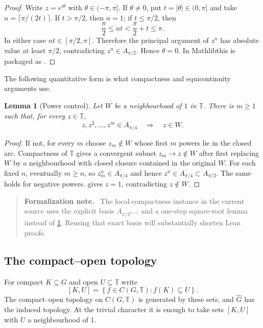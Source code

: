 \documentclass[11pt]{article}
\newtheorem{lemma}[theorem]{Lemma}
\theoremstyle{definition}
\theoremstyle{remark}
\newcommand{\T}{\mathbb T}
\newcommand{\dual}[1]{\widehat{#1}}
\newcommand{\abs}[1]{\lvert #1\rvert}
\newcommand{\set}[1]{\left\{#1\right\}}
\newcommand{\mathlib}{\textsf{Mathlib}}
\newenvironment{formalization}
  {\begin{quote}\small\noindent\textbf{Formalization note.}\ }
  {\end{quote}}
\begin{document}
\begin{proof}
Write $z=e^{i\theta}$ with $\theta\in(-\pi,\pi]$.  If $\theta\neq0$, put
$t=\abs\theta\in(0,\pi]$ and take
$n=\lceil\pi/(2t)\rceil$.  If $t>\pi/2$, then $n=1$; if $t\leq\pi/2$, then
\[
  \frac\pi2\leq nt<\frac\pi2+t\leq\pi.
\]
In either case $nt\in[\pi/2,\pi]$.  Therefore the principal argument of $z^n$ has
absolute value at least $\pi/2$, contradicting $z^n\in A_{\pi/2}$.  Hence $\theta=0$.
In \mathlib this is packaged as
.
\end{proof}

The following quantitative form is what compactness and equicontinuity arguments use.

\begin{lemma}[Power control]
\label{lem:power-control}
Let $W$ be a neighbourhood of $1$ in $\T$.  There is $m\geq1$ such that, for every
$z\in\T$,
\[
  z,z^2,\ldots,z^m\in \overline{A_{\pi/4}}
  \quad\Longrightarrow\quad z\in W.
\]
\end{lemma}

\begin{proof}
If not, for every $m$ choose $z_m\notin W$ whose first $m$ powers lie in the closed arc.
Compactness of $\T$ gives a convergent subnet $z_m\to z\notin W$ after first replacing
$W$ by a neighbourhood with closed closure contained in the original $W$.  For each
fixed $n$, eventually $m\geq n$, so $z_m^n\in\overline{A_{\pi/4}}$ and hence
$z^n\in\overline{A_{\pi/4}}\subset A_{\pi/2}$.  The same holds for negative powers.
 gives $z=1$, contradicting $z\notin W$.
\end{proof}

\begin{formalization}
The local-compactness instance in the current source uses the explicit basis
$A_{\pi/2^{n+1}}$ and a one-step square-root lemma instead of
\cref{lem:power-control}.  Reusing that exact basis will substantially shorten Lean proofs.
\end{formalization}

\subsection{The compact--open topology}

For compact $K\subseteq G$ and open $U\subseteq\T$ write
\[
  [K,U]=\set{f\in C(G,\T):f(K)\subseteq U}.
\]
The compact--open topology on $C(G,\T)$ is generated by these sets, and $\dual G$ has
the induced topology.  At the trivial character it is enough to take sets $[K,U]$ with
$U$ a neighbourhood of $1$.
\end{document}

